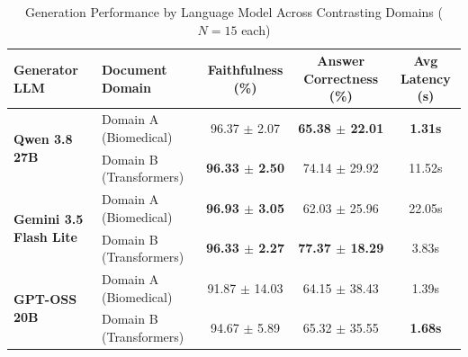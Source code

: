 \documentclass[conference]{IEEEtran}
\begin{document}
\begin{table}[htbp]
\caption{Generation Performance by Language Model Across Contrasting Domains ($N=15$ each)}
\label{tab:generator_results}
\centering
\begin{tabular}{llccc}
\toprule
\textbf{Generator LLM} & \textbf{Document Domain} & \textbf{Faithfulness (\%)} & \textbf{Answer Correctness (\%)} & \textbf{Avg Latency (s)} \\
\midrule
\multirow{2}{*}{\textbf{Qwen 3.8 27B}} 
 & Domain A (Biomedical) & 96.37 $\pm$ 2.07 & \textbf{65.38 $\pm$ 22.01} & \textbf{1.31s} \\
 & Domain B (Transformers) & \textbf{96.33 $\pm$ 2.50} & 74.14 $\pm$ 29.92 & 11.52s \\
\midrule
\multirow{2}{*}{\textbf{Gemini 3.5 Flash Lite}} 
 & Domain A (Biomedical) & \textbf{96.93 $\pm$ 3.05} & 62.03 $\pm$ 25.96 & 22.05s \\
 & Domain B (Transformers) & \textbf{96.33 $\pm$ 2.27} & \textbf{77.37 $\pm$ 18.29} & 3.83s \\
\midrule
\multirow{2}{*}{\textbf{GPT-OSS 20B}} 
 & Domain A (Biomedical) & 91.87 $\pm$ 14.03 & 64.15 $\pm$ 38.43 & 1.39s \\
 & Domain B (Transformers) & 94.67 $\pm$ 5.89 & 65.32 $\pm$ 35.55 & \textbf{1.68s} \\
\bottomrule
\end{tabular}
\end{table}
\end{document}
